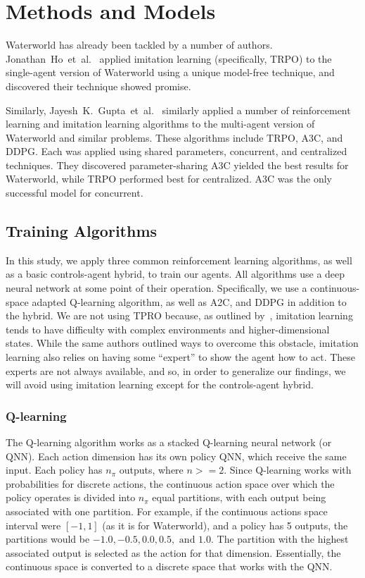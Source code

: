\section{Methods and Models}\label{sec:methods}
Waterworld has already been tackled by a number of authors.
Jonathan~Ho~et~al.~\cite{Ho2016} applied imitation learning (specifically, TRPO) to the
single-agent version of Waterworld using a unique model-free technique, and discovered
their technique showed promise.

Similarly, Jayesh~K.~Gupta~et~al.~\cite{Gupta2017} similarly applied a number of
reinforcement learning and imitation learning algorithms to the multi-agent version
of Waterworld and similar problems.
These algorithms include TRPO, A3C, and DDPG\@.
Each was applied using shared parameters, concurrent, and centralized techniques.
They discovered parameter-sharing A3C yielded the best results for Waterworld, while
TRPO performed best for centralized.
A3C was the only successful model for concurrent.

\subsection{Training Algorithms}\label{subsec:training-algorithms}
In this study, we apply three common reinforcement learning algorithms, as well as a
basic controls-agent hybrid, to train our agents.
All algorithms use a deep neural network at some point of their operation.
Specifically, we use a continuous-space adapted Q-learning algorithm, as well as A2C,
and DDPG in addition to the hybrid.
We are not using TPRO because, as outlined by~\cite{Ho2016}, imitation learning tends
to have difficulty with complex environments and higher-dimensional states.
While the same authors outlined ways to overcome this obstacle, imitation learning
also relies on having some ``expert'' to show the agent how to act.
These experts are not always available, and so, in order to generalize our findings,
we will avoid using imitation learning except for the controls-agent hybrid.

\subsubsection{Q-learning}
The Q-learning algorithm works as a stacked Q-learning neural network (or QNN).
Each action dimension has its own policy QNN, which receive the same input.
Each policy has $n_\pi$ outputs, where $n >= 2$.
Since Q-learning works with probabilities for discrete actions, the continuous
action space over which the policy operates is divided into $n_\pi$ equal partitions,
with each output being associated with one partition.
For example, if the continuous actions space interval were $[-1, 1]$ (as it is for
Waterworld), and a policy has 5 outputs, the partitions would be $-1.0, -0.5, 0.0, 0.5,
\text{ and } 1.0$.
The partition with the highest associated output is selected as the action for that
dimension.
Essentially, the continuous space is converted to a discrete space that works with
the QNN\@.

